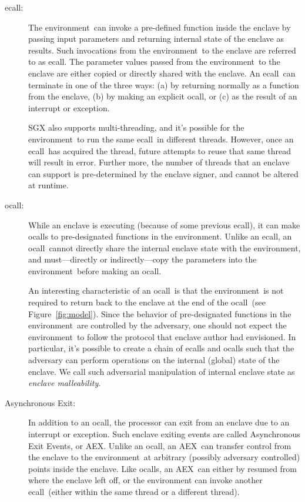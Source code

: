 \documentclass[letterpaper]{article}
\newcommand{\ecall}{\textsf{ecall}}
\newcommand{\ocall}{\textsf{ocall}}
\newcommand{\aex}{\textsf{AEX}}
\newcommand{\env}{\textsf{environment}}
\begin{document}
  \begin{description}
  \item[\ecall:] The \env\ can invoke a pre-defined function inside
    the enclave by passing input parameters and returning internal
    state of the enclave as results. Such invocations from the
    \env\ to the enclave are referred to as \ecall. The parameter
    values passed from the \env\ to the enclave are either copied or
    directly shared with the enclave. An \ecall\ can terminate in one
    of the three ways: (a) by returning normally as a function from
    the enclave, (b) by making an explicit \ocall, or (c) as the
    result of an interrupt or exception.

    SGX also supports multi-threading, and it's possible for the
    \env\ to run the same \ecall\ in different threads. However, once
    an \ecall\ has acquired the thread, future attempts to reuse that
    same thread will result in error. Further more, the number of
    threads that an enclave can support is pre-determined by the
    enclave signer, and cannot be altered at runtime.

  \item [\ocall:] While an enclave is executing (because of some
    previous \ecall), it can make \ocall s to pre-designated functions
    in the \env.  Unlike an \ecall, an \ocall\ cannot directly share
    the internal enclave state with the \env, and must---directly or
    indirectly---copy the parameters into the \env\ before making an
    \ocall.

    An interesting characteristic of an \ocall\ is that the \env\ is
    not required to return back to the enclave at the end of the
    \ocall\ (see Figure~\ref{fig:model}). Since the behavior of
    pre-designated functions in the \env\ are controlled by the
    adversary, one should not expect the \env\ to follow the protocol
    that enclave author had envisioned. In particular, it's possible
    to create a chain of \ecall s and \ocall s such that the adversary
    can perform operations on the internal (global) state of the
    enclave. We call such adversarial manipulation of internal enclave
    state as \textit{enclave malleability}.

  \item[\textsf{Asynchronous Exit}:] In addition to an \ocall, the
    processor can exit from an enclave due to an interrupt or
    exception. Such enclave exiting events are called
    \textsf{Asynchronous Exit Events}, or \aex. Unlike an \ocall, an
    \aex\ can transfer control from the enclave to the \env\ at
    arbitrary (possibly adversary controlled) points inside the
    enclave. Like \ocall s, an \aex\ can either by resumed from where
    the enclave left off, or the environment can invoke another
    \ecall\ (either within the same thread or a different thread).


\end{description}
\end{document}
